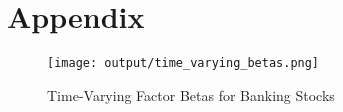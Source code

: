 \documentclass[10pt,parskip=half]{scrartcl}
\numberwithin{equation}{section} %
\numberwithin{figure}{section}   %
\numberwithin{table}{section}    %
\begin{document}
\clearpage

\setcounter{section}{0}
\renewcommand\thesection{\alph{section}}
\section{Appendix}

\begin{figure}[H]
    \centering
    \caption{Time-Varying Factor Betas for Banking Stocks}
    \texttt{[image: output/time\_varying\_betas.png]}
    \label{fig:time-varying-betas}
\end{figure}

\end{document}
